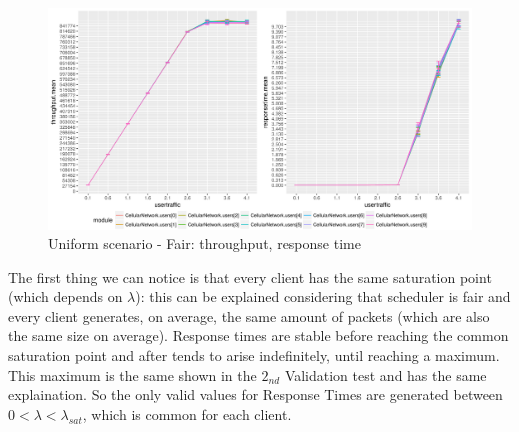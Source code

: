 \begin{figure}[H]
  \includegraphics[width=1\textwidth]{images/all-unif}
  \caption{Uniform scenario - Fair: throughput, response time}
  \label{fig:Uniform scenario - Fair: throughput, response time}
\end{figure}
The first thing we can notice is that every client has the same saturation point (which depends on \(\lambda\)): this can be explained considering that scheduler is fair and every client generates, on average, the same amount of packets (which are also the same size on average). Response times are stable before reaching the common saturation point and after tends to arise indefinitely, until reaching a maximum. This maximum is the same shown in the \(2_{nd}\) Validation test and has the same explaination. So the only valid values for Response Times are generated between \(0 < \lambda < \lambda_{sat}\), which is common for each client. 

